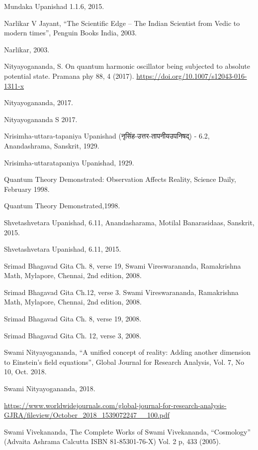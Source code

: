 \documentclass[twoside, 13pt]{article}
\begin{document}
{{{\begin{thebibliography}{99}
\bibitem{} Mundaka Upanishad 1.1.6, 2015.

\bibitem{} Narlikar V Jayant, “The Scientific Edge – The Indian Scientist from Vedic to modern times”, Penguin Books India, 2003.

\bibitem{} Narlikar, 2003.

\bibitem{} Nityayogananda, S. On quantum harmonic oscillator being subjected to absolute potential state. Pramana phy 88, 4 (2017). \url{https://doi.org/10.1007/s12043-016-1311-x}

\bibitem{} Nityayogananda, 2017.

\bibitem{} Nityayogananda S 2017.

\bibitem{} Nrisimha-uttara-tapaniya Upanishad (\foreignlanguage{hindi}{{\fontsize{9}{11}\selectfont नृसिंह-उत्तर-तापनीयउपनिषद्}}) - 6.2, Anandashrama, Sanskrit, 1929.

\bibitem{} Nrisimha-uttaratapaniya Upanishad, 1929.

\bibitem{} Quantum Theory Demonstrated: Observation Affects Reality, Science Daily, February 1998.

\bibitem{} Quantum Theory Demonstrated,1998.

\bibitem{} Shvetashvetara Upanishad, 6.11, Anandasharama, Motilal Banarasidaas, Sanskrit, 2015.

\bibitem{} Shvetashvetara Upanishad, 6.11, 2015.

\bibitem{} Srimad Bhagavad Gita Ch. 8, verse 19, Swami Vireswarananda, Ramakrishna Math, Mylapore, Chennai, 2nd edition, 2008.

\bibitem{} Srimad Bhagavad Gita Ch.12, verse 3. Swami Vireswarananda, Ramakrishna Math, Mylapore, Chennai, 2nd edition, 2008.

\bibitem{} Srimad Bhagavad Gita Ch. 8, verse 19, 2008.

\bibitem{} Srimad Bhagavad Gita Ch. 12, verse 3, 2008.

\bibitem{} Swami Nityayogananda, “A unified concept of reality: Adding another dimension to Einstein’s field equations”, Global Journal for Research Analysis, Vol. 7, No 10, Oct. 2018.

\bibitem{} Swami Nityayogananda, 2018.

\url{https://www.worldwidejournals.com/global-journal-for-research-analysis-GJRA/fileview/October_2018_1539072247__100.pdf}

\bibitem{} Swami Vivekananda, The Complete Works of Swami Vivekananda, “Cosmology” (Advaita Ashrama Calcutta ISBN 81-85301-76-X) Vol. 2 p, 433 (2005).


\end{thebibliography}}}}
\end{document}
